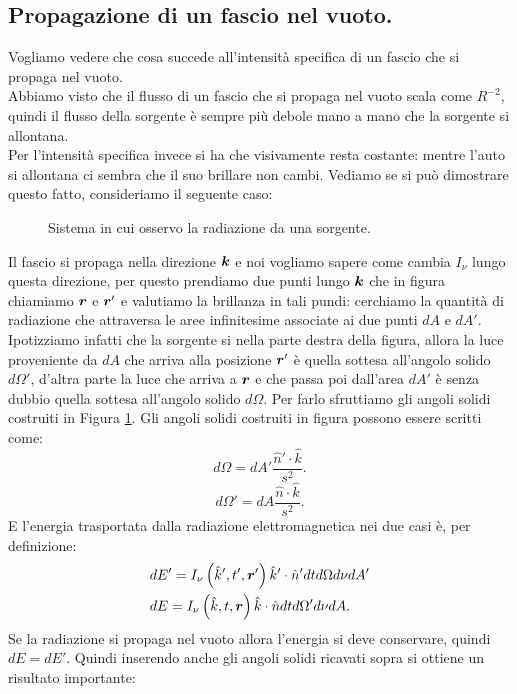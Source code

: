 \subsection{Propagazione di un fascio nel vuoto.}%
Vogliamo vedere che cosa succede all'intensità specifica di un fascio che si propaga nel vuoto.\\
Abbiamo visto che il flusso di un fascio che si propaga nel vuoto scala come $R^{-2}$, quindi il flusso della sorgente è sempre più debole mano a mano che la sorgente si allontana.\\ 
Per l'intensità specifica invece si ha che visivamente resta costante: mentre l'auto si allontana ci sembra che il suo brillare non cambi. Vediamo se si può dimostrare questo fatto, consideriamo il seguente caso:
\begin{figure}[H]
    \centering
    \caption{\scriptsize Sistema in cui osservo la radiazione da una sorgente.}
    \label{fig:brillanza-costante}
\end{figure}
\noindent
Il fascio si propaga nella direzione $\boldsymbol{k}$ e noi vogliamo sapere come cambia $I_{\nu}$ lungo questa direzione, per questo prendiamo due punti lungo $\boldsymbol{k}$ che in figura chiamiamo $\boldsymbol{r}$ e $\boldsymbol{r}'$ e valutiamo la brillanza in tali pundi: cerchiamo la quantità di radiazione che attraversa le aree infinitesime associate ai due punti $dA$ e $dA'$.
Ipotizziamo infatti che la sorgente si nella parte destra della figura, allora la luce proveniente da $dA$ che arriva alla posizione $\boldsymbol{r}'$ è quella sottesa all'angolo solido $d\Omega'$, d'altra parte la luce che arriva a $\boldsymbol{r}$ e che passa poi dall'area $dA'$ è senza dubbio quella sottesa all'angolo solido $d\Omega$.
Per farlo sfruttiamo gli angoli solidi costruiti in Figura \ref{fig:brillanza-costante}. Gli angoli solidi costruiti in figura possono essere scritti come:
\[
	d\Omega = dA' \frac{\hat{n}'\cdot \hat{k}}{s^2}
.\] 
\[
	d\Omega' = dA \frac{\hat{n}\cdot \hat{k}}{s^2}
.\] 
E l'energia trasportata dalla radiazione elettromagnetica nei due casi è, per definizione:
\begin{align}
	&dE' = I_{\nu}\left( \hat{k}', t', \boldsymbol{r}' \right) \hat{k}'\cdot \hat{n}' dt d\Omega d\nu dA'\\
	&dE = I_{\nu}\left( \hat{k}, t, \boldsymbol{r}\right) \hat{k}\cdot \hat{n} dt d\Omega' d\nu dA
.\end{align}
Se la radiazione si propaga nel vuoto allora l'energia si deve conservare, quindi $dE = dE'$. Quindi inserendo anche gli angoli solidi ricavati sopra si ottiene un risultato importante:
